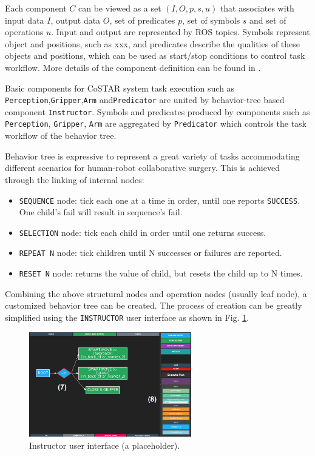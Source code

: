 \documentclass[letterpaper, 10 pt, conference]{ieeeconf}
\begin{document}
Each component $C$ can be viewed as a set $(I,O,p,s,u)$ that associates with input data $I$, output data $O$, set of predicates $p$, set of symbols $s$ and set of operations $u$. Input and output are represented by ROS topics. Symbols represent object and positions, such as xxx, and predicates describe the qualities of these objects and positions, which can be used as start/stop conditions to control task workflow. More details of the component definition can be found in \cite{paxton2017costar}.

Basic components for CoSTAR system task execution such as \texttt{Perception},\texttt{Gripper},\texttt{Arm} and\texttt{Predicator} are united by behavior-tree based component \texttt{Instructor}. Symbols and predicates produced by components such as \texttt{Perception}, \texttt{Gripper}, \texttt{Arm} are aggregated by \texttt{Predicator} which controls the task workflow of the behavior tree. 

Behavior tree is expressive to represent a great variety of tasks accommodating different scenarios for human-robot collaborative surgery. This is achieved through the linking of internal nodes:
 
\begin{itemize}
\item \texttt{SEQUENCE} node: tick each one at a time in order, until one reports \texttt{SUCCESS}. One child's fail will result in sequence's fail.
\item \texttt{SELECTION} node: tick each child in order until one returns success.
\item \texttt{REPEAT N} node: tick children until N successes or failures are reported.
\item \texttt{RESET N} node: returns the value of child, but resets the child up to N times.
\end{itemize} 

Combining the above structural nodes and operation nodes (usually leaf node), a customized behavior tree can be created. The process of creation can be greatly simplified using the \texttt{INSTRUCTOR} user interface as shown in Fig. \ref{fig:instructor}.

\begin{figure}[bt]
\centering
\includegraphics[width=200pt]{instructor.png}
\caption{Instructor user interface (a placeholder).}
\label{fig:instructor}
\end{figure}
\end{document}
